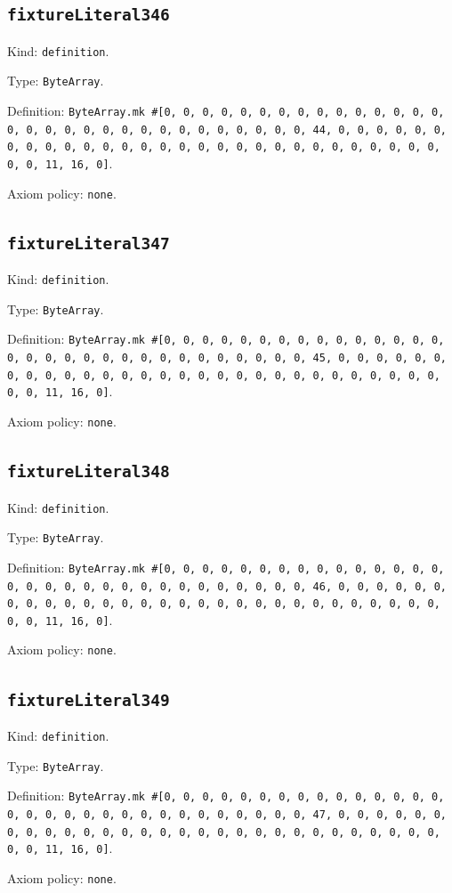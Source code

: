 \documentclass[11pt]{article}
\begin{document}
\subsection*{\texttt{fixtureLiteral346}}
\noindent Kind: \texttt{definition}.\par
\noindent Type: \texttt{ByteArray}.\par
\noindent Definition: \texttt{ByteArray.mk \#[0, 0, 0, 0, 0, 0, 0, 0, 0, 0, 0, 0, 0, 0, 0, 0, 0, 0, 0, 0, 0, 0, 0, 0, 0, 0, 0, 0, 0, 0, 0, 44, 0, 0, 0, 0, 0, 0, 0, 0, 0, 0, 0, 0, 0, 0, 0, 0, 0, 0, 0, 0, 0, 0, 0, 0, 0, 0, 0, 0, 0, 0, 0, 11, 16, 0]}.\par
\noindent Axiom policy: \texttt{none}.\par
\subsection*{\texttt{fixtureLiteral347}}
\noindent Kind: \texttt{definition}.\par
\noindent Type: \texttt{ByteArray}.\par
\noindent Definition: \texttt{ByteArray.mk \#[0, 0, 0, 0, 0, 0, 0, 0, 0, 0, 0, 0, 0, 0, 0, 0, 0, 0, 0, 0, 0, 0, 0, 0, 0, 0, 0, 0, 0, 0, 0, 45, 0, 0, 0, 0, 0, 0, 0, 0, 0, 0, 0, 0, 0, 0, 0, 0, 0, 0, 0, 0, 0, 0, 0, 0, 0, 0, 0, 0, 0, 0, 0, 11, 16, 0]}.\par
\noindent Axiom policy: \texttt{none}.\par
\subsection*{\texttt{fixtureLiteral348}}
\noindent Kind: \texttt{definition}.\par
\noindent Type: \texttt{ByteArray}.\par
\noindent Definition: \texttt{ByteArray.mk \#[0, 0, 0, 0, 0, 0, 0, 0, 0, 0, 0, 0, 0, 0, 0, 0, 0, 0, 0, 0, 0, 0, 0, 0, 0, 0, 0, 0, 0, 0, 0, 46, 0, 0, 0, 0, 0, 0, 0, 0, 0, 0, 0, 0, 0, 0, 0, 0, 0, 0, 0, 0, 0, 0, 0, 0, 0, 0, 0, 0, 0, 0, 0, 11, 16, 0]}.\par
\noindent Axiom policy: \texttt{none}.\par
\subsection*{\texttt{fixtureLiteral349}}
\noindent Kind: \texttt{definition}.\par
\noindent Type: \texttt{ByteArray}.\par
\noindent Definition: \texttt{ByteArray.mk \#[0, 0, 0, 0, 0, 0, 0, 0, 0, 0, 0, 0, 0, 0, 0, 0, 0, 0, 0, 0, 0, 0, 0, 0, 0, 0, 0, 0, 0, 0, 0, 47, 0, 0, 0, 0, 0, 0, 0, 0, 0, 0, 0, 0, 0, 0, 0, 0, 0, 0, 0, 0, 0, 0, 0, 0, 0, 0, 0, 0, 0, 0, 0, 11, 16, 0]}.\par
\noindent Axiom policy: \texttt{none}.\par
\end{document}
